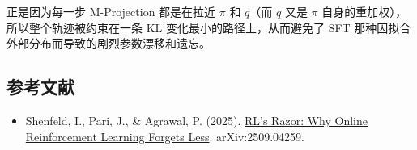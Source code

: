 正是因为每一步 M-Projection 都是在拉近 \(\pi\) 和 \(q\)（而 \(q\) 又是 \(\pi\) 自身的重加权），所以整个轨迹被约束在一条 KL 变化最小的路径上，从而避免了 SFT 那种因拟合外部分布而导致的剧烈参数漂移和遗忘。

\FloatBarrier
{}
\hypertarget{ux53c2ux8003ux6587ux732e-87}{%
\subsection{参考文献}\label{ux53c2ux8003ux6587ux732e-87}}

\vspace{0.25em}
\begin{itemize}
\tightlist
\item
  Shenfeld, I., Pari, J., \& Agrawal, P. (2025). \href{https://arxiv.org/abs/2509.04259}{RL's Razor: Why Online Reinforcement Learning Forgets Less}. arXiv:2509.04259.
\end{itemize}

\clearpage
